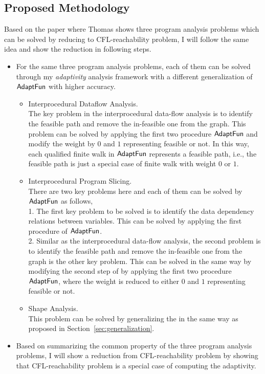 \subsection{Proposed Methodology}
\label{subsec:cfl-methodology}
Based on the paper\cite{Reps98} where Thomas shows 
three program analysis problems 
which can be solved by reducing to CFL-reachability problem, I will follow the same idea and show the reduction
in following steps.
\begin{itemize}
   \item For the same three program analysis problems, each of them 
   can be solved through  my \emph{adaptivity} analysis framework with 
   a different generalization of $\textsf{AdaptFun}$ with higher accuracy.
   \begin{itemize}
      \item Interprocedural Dataflow Analysis.
      \\
      The key problem in the interprocedural data-flow analysis is to identify the feasible path and remove 
      the in-feasible one from the graph.
      This problem can be solved by applying the first two procedure $\textsf{AdaptFun}$ and modify the weight
      by $0$ and $1$ representing feasible or  not. In this way, each qualified finite walk in 
      $\textsf{AdaptFun}$ represents a feasible path, i.e., the feasible path is just a special case of finite walk 
      with weight $0$ or $1$.
      \item Interprocedural Program Slicing.
      \\
      There are two key problems here and each of them can be solved by $\textsf{AdaptFun}$ as follows,
      \\ 
      1. The first key problem to be solved is to identify the data dependency relations between variables. 
      This can be solved by applying the first procedure of $\textsf{AdaptFun}$.
      \\
      2.  Similar as the  interprocedural data-flow analysis, the second problem is to identify the feasible path and remove 
      the in-feasible one from the graph is the other key problem. 
      This can be solved in the same way by modifying the second step of by applying the first two procedure $\textsf{AdaptFun}$,
      where the weight is reduced to either $0$ and $1$ representing feasible or not.
      \item Shape Analysis.
      \\
      This problem can be solved by generalizing the in the same way as proposed in Section~\ref{sec:generalization}.
   \end{itemize}
   \item Based on summarizing the common property of the three program analysis problems,
   I will show a reduction from CFL-reachability problem 
   by showing that CFL-reachability problem is a special case of 
   computing the adaptivity. 
\end{itemize}

